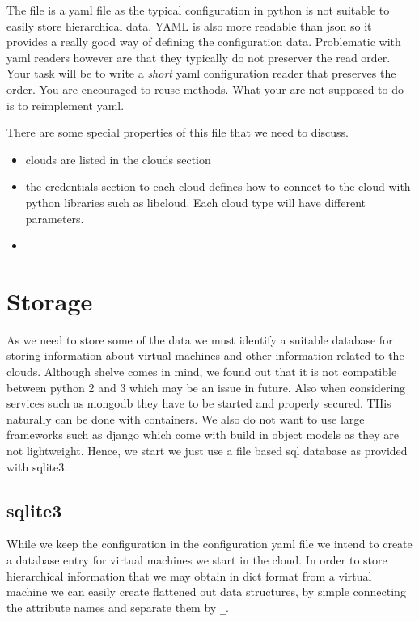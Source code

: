 The file is a yaml file as the typical configuration in python is not
suitable to easily store hierarchical data. YAML is also more readable
than json so it provides a really good way of defining the
configuration data. Problematic with yaml readers however are that
they typically do not preserver the read order. Your task will be to
write a \textit{short} yaml configuration reader that preserves the
order. You are encouraged to reuse methods. What your are not supposed
to do is to reimplement yaml.

There are some special properties of this file that we need to
discuss. 

\begin{itemize}

\item clouds are listed in the clouds section
\item the credentials section to each cloud defines how to connect to
  the cloud with python libraries such as libcloud. Each cloud type will
  have different parameters.
\item 


\end{itemize}



\section{Storage}

As we need to store some of the data we must identify a suitable
database for storing information about virtual machines and other
information related to the clouds. Although shelve comes in mind, we
found out that it is not compatible between python 2 and 3 which may
be an issue in future. Also when considering services such as mongodb
they have to be started and properly secured. THis naturally can be
done with containers. We also do not want to use large frameworks such
as django which come with build in object models as they are not
lightweight. Hence, we start we just use a file based sql
database as provided with sqlite3.

\subsection{sqlite3}

While we keep the configuration in the configuration yaml file we
intend to create a database entry for virtual machines we start in the
cloud. In order to store hierarchical information that we may obtain
in dict format from a virtual machine we can easily create flattened
out data structures, by simple connecting the attribute names and
separate them by \verb|_|.

